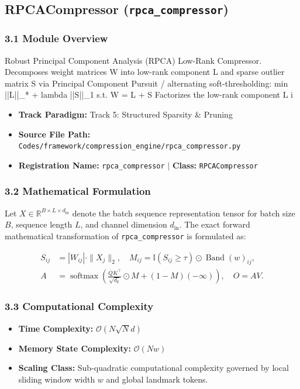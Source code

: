 \subsection{RPCACompressor (\texttt{rpca\_compressor})}
\label{sec:app_module_rpca\_compressor}

\subsubsection*{3.1 Module Overview}
Robust Principal Component Analysis (RPCA) Low-Rank Compressor.  Decomposes weight matrices W into low-rank component L and sparse outlier matrix S via Principal Component Pursuit / alternating soft-thresholding:     min ||L||\_* + lambda ||S||\_1  s.t.  W = L + S Factorizes the low-rank component L i
\begin{itemize}
    \item \textbf{Track Paradigm:} Track 5: Structured Sparsity & Pruning
    \item \textbf{Source File Path:} \texttt{Codes/framework/compression\_engine/rpca\_compressor.py}
    \item \textbf{Registration Name:} \texttt{rpca\_compressor} $\mid$ \textbf{Class:} \texttt{RPCACompressor}
\end{itemize}

\subsubsection*{3.2 Mathematical Formulation}
Let $X \in \mathbb{R}^{B \times L \times d_{\text{in}}}$ denote the batch sequence representation tensor for batch size $B$, sequence length $L$, and channel dimension $d_{\text{in}}$. The exact forward mathematical transformation of \texttt{rpca\_compressor} is formulated as:

\begin{align}
S_{ij} &= |W_{ij}| \cdot \|X_j\|_2, \quad M_{ij} = \mathbb{I}(S_{ij} \ge \tau) \odot \operatorname{Band}(w)_{ij}, \\
A &= \operatorname{softmax}\left(\frac{Q K^\top}{\sqrt{d_k}} \odot M + (1 - M)(-\infty)\right), \quad O = A V.
\end{align}


\subsubsection*{3.3 Computational Complexity}
\begin{itemize}
    \item \textbf{Time Complexity:} $\mathcal{O}(N \sqrt{N} d)$
    \item \textbf{Memory State Complexity:} $\mathcal{O}(N w)$
    \item \textbf{Scaling Class:} Sub-quadratic computational complexity governed by local sliding window width $w$ and global landmark tokens.
\end{itemize}

